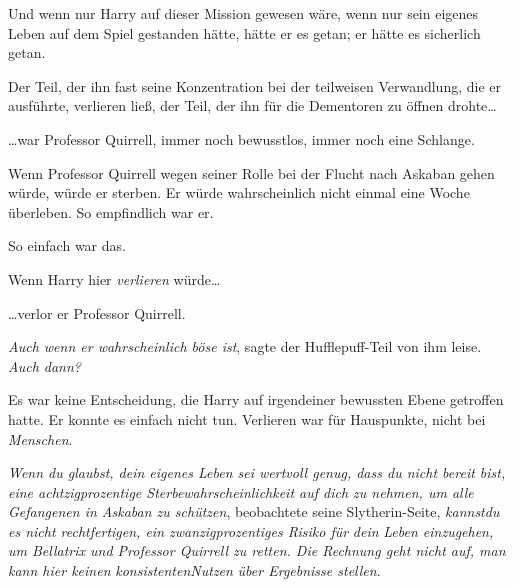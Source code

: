 Und wenn nur Harry auf dieser Mission gewesen wäre, wenn nur sein eigenes Leben auf dem Spiel gestanden hätte, hätte er es getan; er hätte es sicherlich getan.

Der Teil, der ihn fast seine Konzentration bei der teilweisen Verwandlung, die er ausführte, verlieren ließ, der Teil, der ihn für die Dementoren zu öffnen drohte…

…war Professor Quirrell, immer noch bewusstlos, immer noch eine Schlange.

Wenn Professor Quirrell wegen seiner Rolle bei der Flucht nach Askaban gehen würde, würde er sterben. Er würde wahrscheinlich nicht einmal eine Woche überleben. So empfindlich war er.

So einfach war das.

Wenn Harry hier \emph{verlieren} würde…

…verlor er Professor Quirrell.

\emph{Auch wenn er wahrscheinlich böse ist}, sagte der Hufflepuff-Teil von ihm leise. \emph{Auch dann?}

Es war keine Entscheidung, die Harry auf irgendeiner bewussten Ebene getroffen hatte. Er konnte es einfach nicht tun. Verlieren war für Hauspunkte, nicht bei \emph{Menschen}.

\emph{Wenn du glaubst, dein eigenes Leben sei wertvoll genug, dass du nicht bereit bist, eine achtzigprozentige Sterbewahrscheinlichkeit auf dich zu nehmen, um alle Gefangenen in Askaban zu schützen}, beobachtete seine Slytherin-Seite, \emph{kannstdu} \emph{es nicht rechtfertigen, ein zwanzigprozentiges Risiko für} \emph{dein} \emph{Leben einzugehen, um Bellatrix und Professor Quirrell zu retten. Die Rechnung geht nicht auf, man kann hier keinen} \emph{konsistentenNutzen} \emph{über Ergebnisse stellen}.

